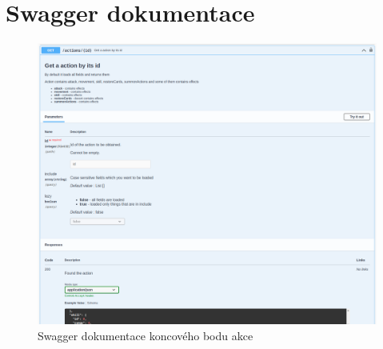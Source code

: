 \chapter{Swagger dokumentace}
\label{sec:swagger}

\begin{figure}[h] %
    \centering
    \includegraphics[width=\textwidth]{figures/impl/endpointSwagger.png}
    \caption{Swagger dokumentace koncového bodu akce}
    \label{fig:action:endpoint}
\end{figure}